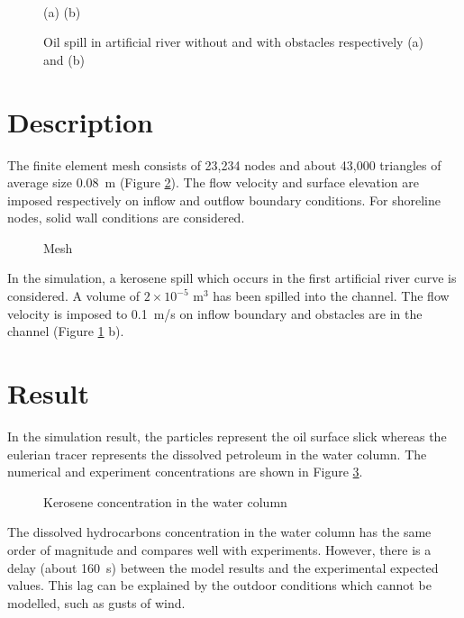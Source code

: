 \begin{figure}[htbp]
  \begin{center}
     \\
\begin{flushleft} \hspace{4.1cm} (a) \hspace{6cm} (b) \end{flushleft} 
  \end{center}
  \caption{Oil spill in artificial river without and with obstacles respectively (a) and (b)}
  \label{fig:obs_oil_spill_in_riv_art}
\end{figure}
%
\section{Description}
%

The finite element mesh consists of 23,234 nodes and about 43,000 triangles of
average size 0.08~m (Figure \ref{fig:riv_art_mesh}).
The flow velocity and surface elevation are imposed respectively on inflow and
outflow boundary conditions.
For shoreline nodes, solid wall conditions are considered.

\begin{figure}[h]
\begin{center}
\end{center}
\caption{Mesh}
\label{fig:riv_art_mesh}
\end{figure}

In the simulation, a kerosene spill which occurs in the first artificial river
curve is considered.
A volume of $2\times 10^{-5}$ m$^3$ has been spilled into the channel.
The flow velocity is imposed to 0.1~m/s on inflow boundary and obstacles are in
the channel (Figure \ref{fig:obs_oil_spill_in_riv_art} b).

\section{Result}

In the simulation result, the particles represent the oil surface slick whereas
the eulerian tracer represents the dissolved petroleum in the water column.
The numerical and experiment concentrations are shown in Figure
\ref{fig:riv_art_simu}.

\begin{figure}[h]
\begin{center}
\end{center}
\caption{Kerosene concentration in the water column}
\label{fig:riv_art_simu}
\end{figure}

The dissolved hydrocarbons concentration in the water column has the same order
of magnitude and compares well with experiments.
However, there is a delay (about 160~s) between the model results and the
experimental expected values.
This lag can be explained by the outdoor conditions which cannot be modelled,
such as gusts of wind.

